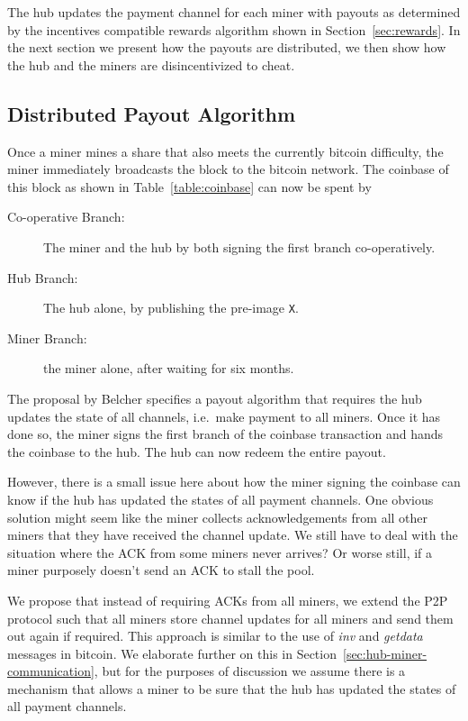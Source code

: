 \documentclass{article}
\begin{document}
The hub updates the payment channel for each miner with payouts as
determined by the incentives compatible rewards algorithm shown in
Section~\ref{sec:rewards}. In the next section we present how the
payouts are distributed, we then show how the hub and the miners are
disincentivized to cheat.

\subsection{Distributed Payout Algorithm}

Once a miner mines a share that also meets the currently bitcoin
difficulty, the miner immediately broadcasts the block to the bitcoin
network. The coinbase of this block as shown in
Table~\ref{table:coinbase} can now be spent by

\begin{description}
\item[Co-operative Branch:] The miner and the hub by both signing the
  first branch co-operatively.
\item[Hub Branch:] The hub alone, by publishing the pre-image \verb|X|.
\item[Miner Branch:] the miner alone, after waiting for six months.
\end{description}

The proposal by Belcher specifies a payout algorithm that requires the
hub updates the state of all channels, i.e.\ make payment to all
miners. Once it has done so, the miner signs the first branch of the
coinbase transaction and hands the coinbase to the hub. The hub can now
redeem the entire payout.

However, there is a small issue here about how the miner signing the
coinbase can know if the hub has updated the states of all payment
channels. One obvious solution might seem like the miner collects
acknowledgements from all other miners that they have received the
channel update. We still have to deal with the situation where the ACK
from some miners never arrives? Or worse still, if a miner purposely
doesn't send an ACK to stall the pool.

We propose that instead of requiring ACKs from all miners, we extend
the P2P protocol such that all miners store channel updates for all
miners and send them out again if required. This approach is similar
to the use of \emph{inv} and \emph{getdata} messages in bitcoin. We
elaborate further on this in
Section~\ref{sec:hub-miner-communication}, but for the purposes of
discussion we assume there is a mechanism that allows a miner to be
sure that the hub has updated the states of all payment channels.
\end{document}
